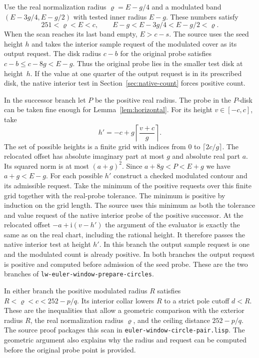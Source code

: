 \documentclass[11pt]{amsart}
\theoremstyle{definition}
\theoremstyle{remark}
\numberwithin{equation}{section}
\newcommand{\code}[1]{\nolinkurl{#1}}
\begin{document}
Use the real normalization radius $\varrho=E-g/4$ and a
modulated band $(E-3g/4,E-g/2)$ with tested inner radius
$E-g$. These numbers satisfy
\[
 251<\varrho<E<c,\qquad
 E-g < E-3g/4 < E-g/2 < \varrho .
\]
When the scan reaches its last band empty, $E>c-s$.
The source uses the seed height $h$ and takes the interior
sample request of the modulated cover as its output request.
The disk radius $c-b$ for the original probe satisfies
$c-b\le c-8g<E-g$.
Thus the original probe lies in the smaller test disk at
height~$h$. If the value at one quarter of the output
request is in its prescribed disk, the native interior
test in Section~\ref{sec:native-count} forces positive count.

In the successor branch let $P$ be the positive real radius.
The probe in the $P$-disk can be taken fine enough for
Lemma~\ref{lem:horizontal}. For its height $v\in[-c,c]$,
take
\[
 h'=-c+g\left\lceil\frac{v+c}{g}\right\rceil .
\]
The set of possible heights is a finite grid with indices
from $0$ to $\lceil2c/g\rceil$. The relocated offset has
absolute imaginary part at most $g$ and absolute real part $a$.
Its squared norm is at most $(a+g)^2$.
Since $a+8g<P<E+g$ we have $a+g<E-g$.
For each possible $h'$ construct a checked modulated contour
and its admissible request. Take the minimum of the positive
requests over this finite grid together with the real-probe
tolerance. The minimum is positive by induction on the grid
length. The source uses this minimum as both the tolerance
and value request of the native interior probe of the positive
successor. At the relocated offset $-a+\mathrm i(v-h')$
the argument of the evaluator is exactly the same as on the
real chart, including the rational height. It therefore passes
the native interior test at height $h'$. In this branch the
output sample request is one and the modulated count is
already positive. In both branches the output request is
positive and computed before admission of the seed probe.
These are the two branches of \code{lw-euler-window-prepare-circles}.

In either branch the positive modulated radius $R$ satisfies
$R<\varrho<c<252-p/q$. Its interior collar lowers $R$ to a
strict pole cutoff $d<R$. These are the inequalities that allow
a geometric comparison with the exterior radius $R$, the real
normalization radius $\varrho$, and the ceiling distance
$252-p/q$. The source proof packages this scan in
\code{euler-window-circle-pair.lisp}. The geometric argument
also explains why the radius and request can be computed before
the original probe point is provided.
\end{document}
